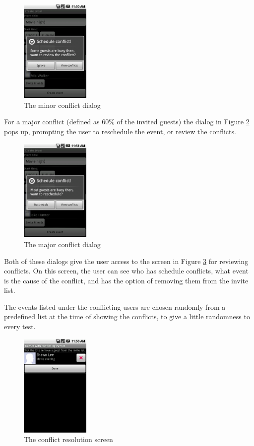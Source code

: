 \documentclass[]{report}
\begin{document}
\begin{figure}[htb]
  \centering
  \includegraphics[height=50mm]{minor}
  \caption{The minor conflict dialog}
  \label{fig:minor}
\end{figure}

For a major conflict (defined as 60\% of the invited guests) the dialog in
Figure \ref{fig:major} pops up, prompting the user to reschedule the event, or
review the conflicts.

\begin{figure}[htb]
  \centering
  \includegraphics[height=50mm]{major}
  \caption{The major conflict dialog}
  \label{fig:major}
\end{figure}

Both of these dialogs give the user access to the screen in Figure
\ref{fig:resolve} for reviewing conflicts. On this screen, the user can see who
has schedule conflicts, what event is the cause of the conflict, and has the
option of removing them from the invite list.

The events listed under the conflicting users are chosen randomly from a
predefined list at the time of showing the conflicts, to give a little
randomness to every test.

\begin{figure}[htb]
  \centering
  \includegraphics[height=50mm]{resolution}
  \caption{The conflict resolution screen}
  \label{fig:resolve}
\end{figure}
\end{document}
